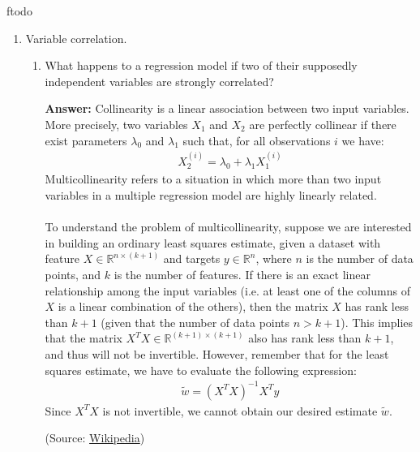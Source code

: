 ƒtodo\documentclass{article}
\newenvironment{QandA}{\begin{enumerate}[label=\arabic*.]}{\end{enumerate}}
\newenvironment{InnerQandA}{\begin{enumerate}[label=\roman*.]}{\end{enumerate}}
\newenvironment{answer}{\par\normalfont \textbf{Answer:}}{}
\newcommand{\R}{\mathbb{R}}
\begin{document}
\begin{QandA}
    \item Variable correlation.
    \begin{InnerQandA}
        \item What happens to a regression model if two of their supposedly independent variables are strongly correlated?
        \begin{answer}
            Collinearity is a linear association between two input variables. More precisely, two variables $X_1$ and $X_2$ are perfectly collinear if there exist parameters $\lambda_0$ and $\lambda_1$ such that, for all observations $i$ we have:
            \begin{align*}
                X_{2}^{(i)} = \lambda_0 + \lambda_1 X_{1}^{(i)}
            \end{align*}
            Multicollinearity refers to a situation in which more than two input variables in a multiple regression model are highly linearly related. \\\\
            To understand the problem of multicollinearity, suppose we are interested in building an ordinary least squares estimate, given a dataset with feature $X \in \R^{n \times (k+1)}$ and targets $y \in \R^{n}$, where $n$ is the number of data points, and $k$ is the number of features. If there is an exact linear relationship among the input variables (i.e. at least one of the columns of $X$ is a linear combination of the others), then the matrix $X$ has rank less than $k+1$ (given that the number of data points $n > k+1$). This implies that the matrix $X^T X \in \R^{(k+1) \times (k+1)}$ also has rank less than $k+1$, and thus will not be invertible. However, remember that for the least squares estimate, we have to evaluate the following expression:
            \begin{align*}
                \tilde{w} = (X^T X)^{-1} X^T y
            \end{align*}
            Since $X^T X$ is not invertible, we cannot obtain our desired estimate $\tilde{w}$. 
            
            (Source: \href{https://en.wikipedia.org/wiki/Multicollinearity}{Wikipedia})
        \end{answer}


\end{InnerQandA}
\end{QandA}
\end{document}
